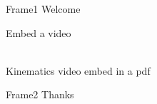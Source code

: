 \documentclass{beamer}
\begin{document}
	\begin{frame}{Frame1}
			Welcome  	
	\end{frame}
	
    \begin{frame}{Embed a video}
        \begin{center}
            \\
            Kinematics video embed in a pdf
        \end{center}
        
    \end{frame}
    
    \begin{frame}{Frame2}
    	Thanks    	
    \end{frame}
\end{document}
